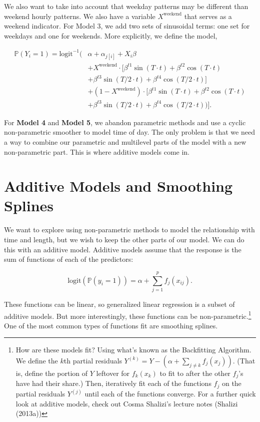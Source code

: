\documentclass[12pt,twoside]{reedthesis}
\begin{document}
  We also want to take into account that weekday patterns may be different
  than weekend hourly patterns. We also have a variable
  \(X^\text{weekend}\) that serves as a weekend indicator. For Model 3, we
  add two sets of sinusoidal terms: one set for weekdays and one for
  weekends. More explicitly, we define the model,
  
  \begin{equation}
  \begin{split}
  \mathbb{P} (Y_i=1) = \text{logit}^{-1} (&\alpha + \alpha_{j[i]} + X_i \beta \\
  &+ X^\text{weekend} \cdot [\beta^{t1} \sin(T \cdot t) + \beta^{t2} \cos (T \cdot t)\\
  &+ \beta^{t3} \sin(T/2 \cdot t) + \beta^{t4} \cos (T/2 \cdot t)]\\
  &+ (1 - X^\text{weekend}) \cdot [\beta^{t1} \sin(T \cdot t) + \beta^{t2} \cos (T \cdot t)\\
  &+ \beta^{t3} \sin(T/2 \cdot t) + \beta^{t4} \cos (T/2 \cdot t))].
  \end{split}
  \end{equation}
  
  For \textbf{Model 4} and \textbf{Model 5}, we abandon parametric methods
  and use a cyclic non-parametric smoother to model time of day. The only
  problem is that we need a way to combine our parametric and multilevel
  parts of the model with a new non-parametric part. This is where
  additive models come in.
  
  \section{Additive Models and Smoothing
  Splines}\label{additive-models-and-smoothing-splines}
  
  We want to explore using non-parametric methods to model the
  relationship with time and length, but we wish to keep the other parts
  of our model. We can do this with an additive model. Additive models
  assume that the response is the sum of functions of each of the
  predictors:
  
  \[\text{logit} (\mathbb{P}(y_i = 1)) =
  \alpha + \sum_{j = 1}^p f_j(x_{ij}).\]
  
  These functions can be linear, so generalized linear regression is a
  subset of additive models. But more interestingly, these functions can
  be non-parametric.\footnote{How are these models fit? Using what's known
    as the Backfitting Algorithm. We define the \(k\)th partial residuals
    \(Y^{(k)} = Y - \left(\alpha + \sum_{j \neq k} f_j(x_j)\right)\).
    (That is, define the portion of \(Y\) leftover for \(f_k(x_k)\) to fit
    to after the other \(f_j\)'s have had their share.) Then, iteratively
    fit each of the functions \(f_j\) on the partial residuals \(Y^{(j)}\)
    until each of the functions converge. For a further quick look at
    additive models, check out Cosma Shalizi's lecture notes (Shalizi
    (2013a))} One of the most common types of functions fit are smoothing
  splines.
  
\end{document}
